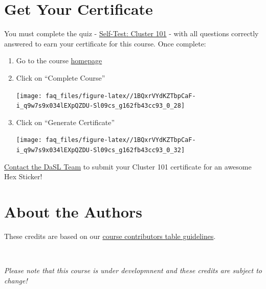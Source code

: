 \documentclass[
]{book}
\begin{document}
\hypertarget{get-your-certificate}{%
\chapter*{Get Your Certificate}\label{get-your-certificate}}

You must complete the quiz - \href{https://leanpub.com/courses/fredhutch/fredhutchcluster101/quizzes/self_test_101}{Self-Test: Cluster 101} -
with all questions correctly answered to earn your certificate for this course. Once complete:

\begin{enumerate}
\def\labelenumi{\arabic{enumi}.}
\item
  Go to the course \href{https://leanpub.com/courses/fredhutch/fredhutchcluster101/home}{homepage}\\
\item
  Click on ``Complete Course''

  \texttt{[image: faq\_files/figure-latex//1BQxrVYdKZTbpCaF-i\_q9w7s9x034lEXpQZDU-Sl09cs\_g162fb43cc93\_0\_28]}
\item
  Click on ``Generate Certificate''

  \texttt{[image: faq\_files/figure-latex//1BQxrVYdKZTbpCaF-i\_q9w7s9x034lEXpQZDU-Sl09cs\_g162fb43cc93\_0\_32]}
\end{enumerate}

\href{mailto:data@fredhutch.org}{Contact the DaSL Team} to submit your Cluster 101 certificate for an awesome Hex Sticker!

\hypertarget{about-the-authors}{%
\chapter*{About the Authors}\label{about-the-authors}}

These credits are based on our \href{https://github.com/jhudsl/OTTR_Template/wiki/How-to-give-credits}{course contributors table guidelines}.

~
~

\emph{Please note that this course is under developmnent and these credits are subject to change!}
\end{document}
